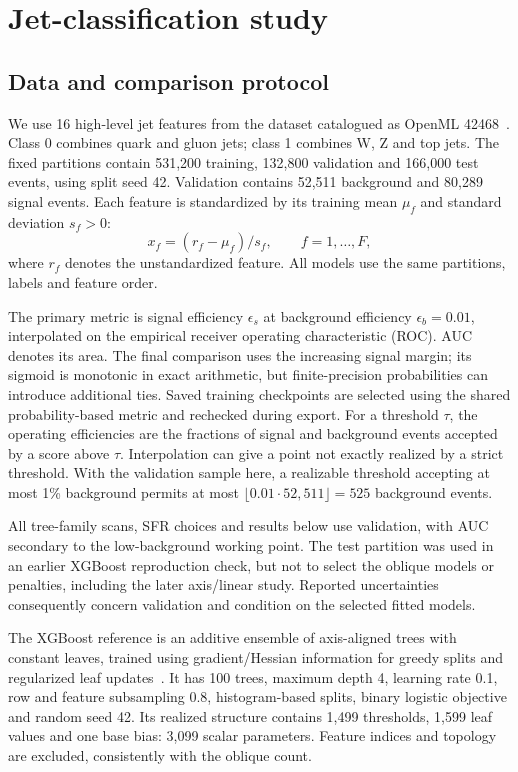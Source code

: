\documentclass[11pt,a4paper]{article}
\begin{document}
\section{Jet-classification study}
\label{sec:data}
\subsection{Data and comparison protocol}
We use 16 high-level jet features from the dataset catalogued as OpenML
42468~\cite{openml42468}. Class 0 combines quark and gluon jets; class 1 combines
W, Z and top jets. The fixed partitions contain 531,200 training, 132,800
validation and 166,000 test events, using split seed 42. Validation contains
52,511 background and 80,289 signal events. Each feature is standardized by
its training mean $\mu_f$ and standard deviation $s_f>0$:
\begin{equation}
 x_f=(r_f-\mu_f)/s_f,\qquad f=1,\ldots,F,
 \label{eq:standardization}
\end{equation}
where $r_f$ denotes the unstandardized feature. All models use the same
partitions, labels and feature order.

The primary metric is signal efficiency $\epsilon_s$ at background efficiency
$\epsilon_b=0.01$, interpolated on the empirical receiver operating
characteristic (ROC). AUC denotes its area. The final comparison uses the increasing signal margin; its sigmoid is
monotonic in exact arithmetic, but finite-precision probabilities can introduce
additional ties. Saved training checkpoints are selected using the shared
probability-based metric and rechecked during export. For a threshold $\tau$, the operating efficiencies are the
fractions of signal and background events accepted by a score above $\tau$.
Interpolation can give a point not exactly realized by a strict threshold.
With the validation sample here, a realizable threshold accepting at most
1\% background permits at most $\lfloor0.01\cdot52{,}511\rfloor=525$
background events.

All tree-family scans, SFR choices and results below use validation, with AUC
secondary to the low-background working point. The test partition was used
in an earlier XGBoost reproduction check, but not to select the oblique models
or penalties, including the later axis/linear study. Reported uncertainties consequently concern validation and
condition on the selected fitted models.

The XGBoost reference is an additive ensemble of axis-aligned trees with
constant leaves, trained using gradient/Hessian information for greedy splits
and regularized leaf updates~\cite{xgboost}. It has 100 trees, maximum depth 4,
learning rate 0.1, row and feature subsampling 0.8, histogram-based splits,
binary logistic objective and random seed 42. Its realized structure contains
1,499 thresholds, 1,599 leaf values and one base bias: 3,099 scalar parameters.
Feature indices and topology are excluded, consistently with the oblique count.
\end{document}
